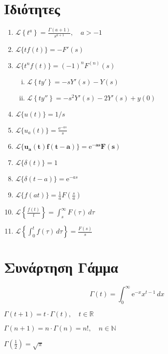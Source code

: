 {  \section*{Ιδιότητες}
  \begin{enumerate}
    \item $ \mathcal{L}\left\{t^{a}\right\} = \frac{\Gamma{(a+1)}}{s^{a+1}}, \quad a>-1 $
    \item $ \mathcal{L}\{tf(t)\} = -F'(s) $
    \item $ \mathcal{L}\{t^{n}f(t)\} = (-1)^{n} F^{(n)}(s) $
      \begin{enumerate}[i)]
        \item $ \mathcal{L}\left\{ty'\right\} = -sY'(s)-Y(s) $ 
        \item $ \mathcal{L}\left\{ty''\right\} = -s^{2}Y'(s)-2Y'(s)+y(0) $ 
      \end{enumerate}
    \item $ \mathcal{L}\{u(t)\} = {1}/{s}$
    \item $ \mathcal{L}\{u_{a}(t)\} = \frac{\mathrm{e}^{-as}}{s}$
    \item $ \bm{\mathcal{L}\{u_{a}(t)f(t-a)\} = \mathrm{e}^{-as}F(s)}$
    \item $ \mathcal{L}\{\delta(t)\} = 1 $
    \item $ \mathcal{L}\{\delta(t-a)\} = \mathrm{e}^{-as} $
    \item $ \mathcal{L}\{f(at)\} = \frac{1}{a} F\left(\frac{s}{a}\right) $
    \item $ \mathcal{L}\left\{\frac{f(t)}{t} \right\} = \int\nolimits _{s}^{\infty} 
      F(\tau) \,{d\tau} $
    \item $ \mathcal{L}\left\{\int\nolimits _{0}^{t} f(\tau) \,{d\tau}\right\} = 
      \frac{F(s)}{s} $
  \end{enumerate}

  \section*{Συνάρτηση Γάμμα}
  \[
    \boxed{\Gamma (t) = \int _{0}^{\infty} \mathrm{e}^{-x} x^{t-1} \,{dx}}
  \] 
  \begin{myitemize}
    \item $\Gamma (t+1) = t \cdot \Gamma (t), \quad t \in \mathbb{R} $
    \item $\Gamma (n+1) = n \cdot \Gamma (n) = n!, \quad n \in \mathbb{N}$
    \item $\Gamma \left(\frac{1}{2}\right) = \sqrt{\pi}$
  \end{myitemize}
}


